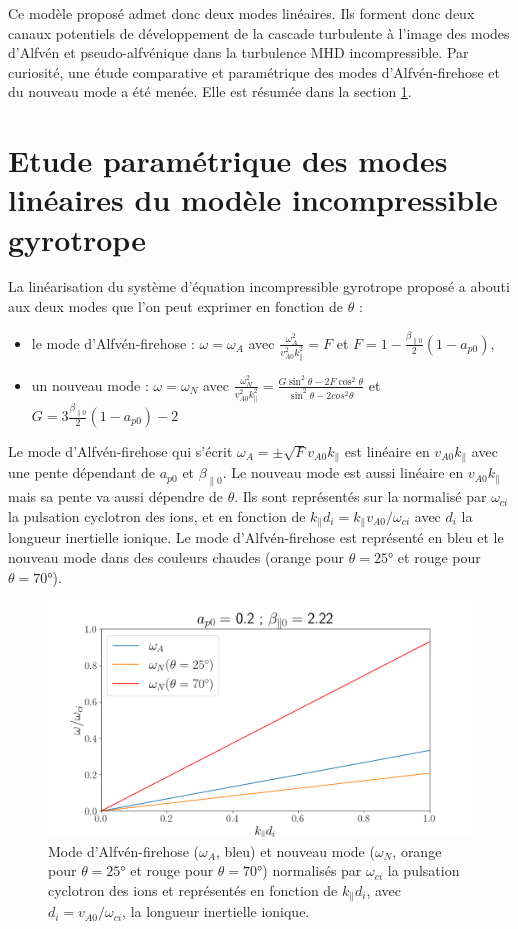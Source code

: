 Ce modèle proposé admet donc deux modes linéaires. Ils forment donc deux canaux potentiels de développement de la cascade turbulente à l'image des modes d'Alfvén et pseudo-alfvénique dans la turbulence \ac{MHD} incompressible. Par curiosité, une étude comparative et paramétrique des modes d'Alfvén-firehose et du nouveau mode a été menée. Elle est résumée dans la section \ref{sec-223}.

\section{Etude paramétrique des modes linéaires du modèle incompressible gyrotrope } \label{sec-223}

La linéarisation du système d'équation incompressible gyrotrope proposé a abouti aux deux modes que l'on peut exprimer en fonction de $\theta$ : 
\begin{itemize}
    \item le mode d'Alfvén-firehose : $\omega =  \omega_A$ avec $\frac{\omega^2_A}{v^2_{A0}k^2_{\parallel}} = F $ et $F = 1 - \frac{\beta_{\parallel 0}}{2}(1-a_{p0})$,
    \item un nouveau mode : $\omega = \omega_N$ avec $\frac{\omega^2_N}{v^2_{A0}k^2_{\parallel}} =  \frac{G \sin^2 \theta - 2F \cos^2 \theta}{ \sin^2 \theta - 2 cos^2 \theta} $ et $G =  3\frac{\beta_{\parallel 0}}{2}(1-a_{p0}) -2$
\end{itemize}
Le mode d'Alfvén-firehose qui s'écrit $\omega_A = \pm \sqrt{F } v_{A0} k_{\parallel} $ est linéaire en $v_{A0} k_{\parallel}$ avec une pente dépendant de $a_{p0}$ et $\beta_{\parallel 0}$. Le nouveau mode est aussi  linéaire en $v_{A0} k_{\parallel}$  mais sa pente va aussi dépendre de $\theta$.  
Ils sont représentés sur la   normalisé par $\omega_{ci}$ la pulsation cyclotron des ions, et en fonction de $k_{\parallel}d_i = k_{\parallel} v_{A0}/ \omega_{ci} $ avec $d_i$ la longueur inertielle ionique. Le mode d'Alfvén-firehose est représenté en bleu et le nouveau mode dans des couleurs chaudes (orange pour $\theta = \ang{25}$ et rouge pour $\theta=\ang{70}$).
\begin{figure}[!ht]
 \centering
\includegraphics[width=0.8\linewidth,trim=2cm 0cm 3cm 1cm, clip=true]{./Part_2/images/lin_omega_k}
\caption{Mode d'Alfvén-firehose ($\omega_A$, bleu) et nouveau mode ($\omega_N $, orange pour $\theta = \ang{25}$ et rouge pour $\theta=\ang{70}$) normalisés par $\omega_{ci}$ la pulsation cyclotron des ions et représentés en fonction de $k_{\parallel}d_i$, avec $d_i = v_{A0}/ \omega_{ci}$, la longueur inertielle ionique. } 
\label{fig:lin_omega_k}
\end{figure}
